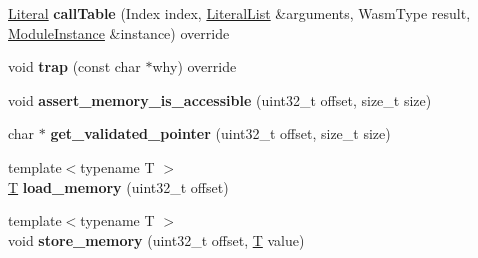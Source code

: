 \begin{DoxyCompactItemize}
\mbox{\hyperlink{classwasm_1_1_literal}{Literal}} {\bfseries call\+Table} (Index index, \mbox{\hyperlink{classstd_1_1vector}{Literal\+List}} \&arguments, Wasm\+Type result, \mbox{\hyperlink{classwasm_1_1_module_instance}{Module\+Instance}} \&instance) override
\item 
\mbox{\label{structaacio_1_1chain_1_1webassembly_1_1binaryen_1_1interpreter__interface_a5972dfad77b36228d0d98749bb3d906f}} 
void {\bfseries trap} (const char $\ast$why) override
\item 
\mbox{\label{structaacio_1_1chain_1_1webassembly_1_1binaryen_1_1interpreter__interface_ab637404fa2117d7d7c8c9022a81ad5e9}} 
void {\bfseries assert\+\_\+memory\+\_\+is\+\_\+accessible} (uint32\+\_\+t offset, size\+\_\+t size)
\item 
\mbox{\label{structaacio_1_1chain_1_1webassembly_1_1binaryen_1_1interpreter__interface_a85421748937fb7e2c5f2c859edba7aa7}} 
char $\ast$ {\bfseries get\+\_\+validated\+\_\+pointer} (uint32\+\_\+t offset, size\+\_\+t size)
\item 
\mbox{\label{structaacio_1_1chain_1_1webassembly_1_1binaryen_1_1interpreter__interface_a0b8c968665da338b69b045565d127816}} 
{\footnotesize template$<$typename T $>$ }\\\mbox{\hyperlink{struct_t}{T}} {\bfseries load\+\_\+memory} (uint32\+\_\+t offset)
\item 
\mbox{\label{structaacio_1_1chain_1_1webassembly_1_1binaryen_1_1interpreter__interface_a0bdf2d22cfb08b186c873e9b181d510a}} 
{\footnotesize template$<$typename T $>$ }\\void {\bfseries store\+\_\+memory} (uint32\+\_\+t offset, \mbox{\hyperlink{struct_t}{T}} value)
\item 
\mbox{\label{structaacio_1_1chain_1_1webassembly_1_1binaryen_1_1interpreter__interface_a1f1f7b374e2910fdb8623f390a47bf38}} 

\end{DoxyCompactItemize}
